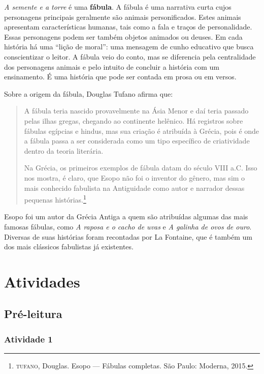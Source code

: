 \documentclass[11pt]{extarticle}
\begin{document}
\textit{A semente e a torre} é uma \textbf{fábula}. A fábula é uma narrativa curta cujos personagens principais geralmente são animais personificados.  Estes animais apresentam características humanas, tais como a fala e traços de personalidade. Essas personagens podem ser também objetos animados ou deuses. Em cada história há uma ``lição de moral'': uma mensagem de cunho educativo que busca conscientizar o leitor. A fábula veio do conto, mas se diferencia pela centralidade dos personagens animais e pelo intuito de concluir a história com um ensinamento. É uma história que pode ser contada em prosa ou em versos. 

Sobre a origem da fábula, Douglas Tufano afirma que:

\begin{quote} A fábula teria nascido provavelmente na Ásia Menor e daí teria passado pelas ilhas gregas, chegando ao continente helênico. Há registros sobre fábulas egípcias e hindus, mas sua criação é atribuída à Grécia, pois é onde a fábula passa a ser considerada como um tipo específico de criatividade dentro da teoria literária. 

Na Grécia, os primeiros exemplos de fábula datam do século VIII a.C. Isso nos mostra, é claro, que Esopo não foi o inventor do gênero, mas sim o mais conhecido fabulista na Antiguidade como autor e narrador dessas pequenas histórias.\footnote{\textsc{tufano}, Douglas. Esopo --- Fábulas completas. São Paulo: Moderna, 2015.}\end{quote}

Esopo foi um autor da Grécia Antiga a quem são atribuídas algumas das mais famosas fábulas, como \textit{A raposa e o cacho de uvas} e \textit{A galinha de ovos de ouro}. Diversas de suas histórias foram recontadas por La Fontaine, que é também um dos mais clássicos fabulistas já existentes. 

\section{Atividades}

\subsection{Pré-leitura}

\subsubsection{Atividade 1}
\end{document}
